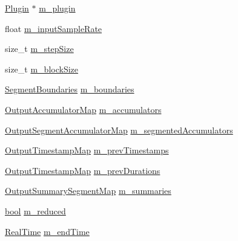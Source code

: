 \begin{DoxyCompactItemize}
\item 
\hyperlink{class_vamp_1_1_plugin}{Plugin} $\ast$ \hyperlink{class_vamp_1_1_host_ext_1_1_plugin_summarising_adapter_1_1_impl_a6267cb01f23c0cee40f4b8b6c6961888}{m\+\_\+plugin}
\item 
float \hyperlink{class_vamp_1_1_host_ext_1_1_plugin_summarising_adapter_1_1_impl_a9b4c146e64c11ac75d0b1c794509eeb2}{m\+\_\+input\+Sample\+Rate}
\item 
size\+\_\+t \hyperlink{class_vamp_1_1_host_ext_1_1_plugin_summarising_adapter_1_1_impl_af3acf32f9acd7df6be09935c8aa0d5f6}{m\+\_\+step\+Size}
\item 
size\+\_\+t \hyperlink{class_vamp_1_1_host_ext_1_1_plugin_summarising_adapter_1_1_impl_a9de14d13b51d7bf33ca5a8a6301cfe33}{m\+\_\+block\+Size}
\item 
\hyperlink{class_vamp_1_1_host_ext_1_1_plugin_summarising_adapter_a74e7f93c745802a2409185b63922466b}{Segment\+Boundaries} \hyperlink{class_vamp_1_1_host_ext_1_1_plugin_summarising_adapter_1_1_impl_aee7d159ac6fc33befc5f67100aa0ecd0}{m\+\_\+boundaries}
\item 
\hyperlink{class_vamp_1_1_host_ext_1_1_plugin_summarising_adapter_1_1_impl_a9f0659491f7b4894576b6bb8448df68d}{Output\+Accumulator\+Map} \hyperlink{class_vamp_1_1_host_ext_1_1_plugin_summarising_adapter_1_1_impl_ad43a9d7cfb6147e1902c9365b237b460}{m\+\_\+accumulators}
\item 
\hyperlink{class_vamp_1_1_host_ext_1_1_plugin_summarising_adapter_1_1_impl_a6b12d5110338dc49aadebec6a9df6cb9}{Output\+Segment\+Accumulator\+Map} \hyperlink{class_vamp_1_1_host_ext_1_1_plugin_summarising_adapter_1_1_impl_a69edd53a669f2a17367d11846f69f9c6}{m\+\_\+segmented\+Accumulators}
\item 
\hyperlink{class_vamp_1_1_host_ext_1_1_plugin_summarising_adapter_1_1_impl_ad83240cc69ac691abb06a7fe662a357d}{Output\+Timestamp\+Map} \hyperlink{class_vamp_1_1_host_ext_1_1_plugin_summarising_adapter_1_1_impl_aed10afce36913ba0b8cc2d2616f12a89}{m\+\_\+prev\+Timestamps}
\item 
\hyperlink{class_vamp_1_1_host_ext_1_1_plugin_summarising_adapter_1_1_impl_ad83240cc69ac691abb06a7fe662a357d}{Output\+Timestamp\+Map} \hyperlink{class_vamp_1_1_host_ext_1_1_plugin_summarising_adapter_1_1_impl_aad8cd7b8ffa91818c58f26d1fd58d101}{m\+\_\+prev\+Durations}
\item 
\hyperlink{class_vamp_1_1_host_ext_1_1_plugin_summarising_adapter_1_1_impl_a6c95c2005205834e54eb1f3c671205c3}{Output\+Summary\+Segment\+Map} \hyperlink{class_vamp_1_1_host_ext_1_1_plugin_summarising_adapter_1_1_impl_afff5c7cea6fd61260bbf001c9b77c936}{m\+\_\+summaries}
\item 
\hyperlink{mac_2config_2i386_2lib-src_2libsoxr_2soxr-config_8h_abb452686968e48b67397da5f97445f5b}{bool} \hyperlink{class_vamp_1_1_host_ext_1_1_plugin_summarising_adapter_1_1_impl_af7e3175ea990a028fc730b9a2ec6272a}{m\+\_\+reduced}
\item 
\hyperlink{struct_vamp_1_1_real_time}{Real\+Time} \hyperlink{class_vamp_1_1_host_ext_1_1_plugin_summarising_adapter_1_1_impl_aaf9779f5a71751edf56489b1a9c0e634}{m\+\_\+end\+Time}
\end{DoxyCompactItemize}



